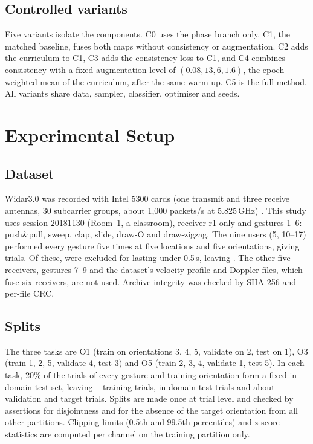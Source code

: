 \documentclass[conference]{IEEEtran}
\begin{document}
\subsection{Controlled variants}
Five variants isolate the components. C0 uses the phase branch only. C1, the matched baseline, fuses both maps without consistency or augmentation. C2 adds the curriculum to C1, C3 adds the consistency loss to C1, and C4 combines consistency with a fixed augmentation level of $(0.08,13,6,1.6)$, the epoch-weighted mean of the curriculum, after the same warm-up. C5 is the full method. All variants share data, sampler, classifier, optimiser and seeds.

\section{Experimental Setup}\label{sec:setup}
\subsection{Dataset}
Widar3.0 \cite{zhang2022widar3} was recorded with Intel 5300 cards (one transmit and three receive antennas, 30 subcarrier groups, about 1,000 packets/s at 5.825\,GHz) \cite{halperin2011csitool}. This study uses session 20181130 (Room~1, a classroom), receiver r1 only and gestures 1--6: push\&pull, sweep, clap, slide, draw-O and draw-zigzag. The nine users (5, 10--17) performed every gesture five times at five locations and five orientations, giving \NTrials{} trials. Of these, \NExcluded{} were excluded for lasting under 0.5\,s, leaving \NValid. The other five receivers, gestures 7--9 and the dataset's velocity-profile and Doppler files, which fuse six receivers, are not used. Archive integrity was checked by SHA-256 and per-file CRC.

\subsection{Splits}
The three tasks are O1 (train on orientations 3, 4, 5, validate on 2, test on 1), O3 (train 1, 2, 5, validate 4, test 3) and O5 (train 2, 3, 4, validate 1, test 5). In each task, 20\% of the trials of every gesture and training orientation form a fixed in-domain test set, leaving \NTrain--\NTrainMax{} training trials, \NIDTest{} in-domain test trials and about \NVal{} validation and \NTarget{} target trials. Splits are made once at trial level and checked by assertions for disjointness and for the absence of the target orientation from all other partitions. Clipping limits (0.5th and 99.5th percentiles) and z-score statistics are computed per channel on the training partition only.
\end{document}
